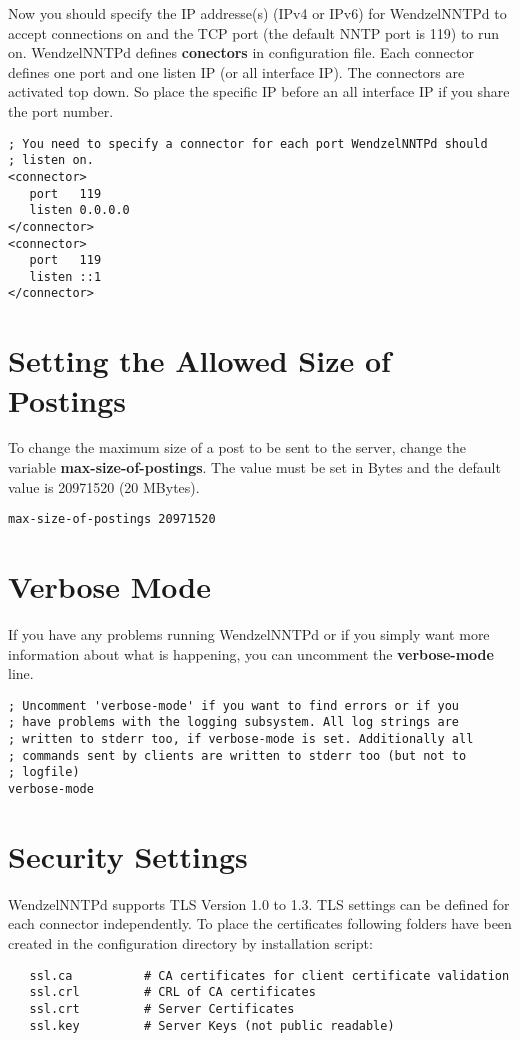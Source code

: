 Now you should specify the IP addresse(s) (IPv4 or IPv6) for WendzelNNTPd to accept connections on and the TCP port (the default NNTP port is 119) to run on.
WendzelNNTPd defines \textbf{conectors} in configuration file.
Each connector defines one port and one listen IP (or all interface IP).
The connectors are activated top down.
So place the specific IP before an all interface IP if you share the port number.

\begin{verbatim}
; You need to specify a connector for each port WendzelNNTPd should
; listen on.
<connector>
   port   119
   listen 0.0.0.0
</connector>
<connector>
   port   119
   listen ::1
</connector>
\end{verbatim}

\section{Setting the Allowed Size of Postings}

To change the maximum size of a post to be sent to the server, change the variable \textbf{max-size-of-postings}. The value must be set in Bytes and the default value is 20971520 (20 MBytes).

\begin{verbatim}
max-size-of-postings 20971520
\end{verbatim}

\section{Verbose Mode}

If you have any problems running WendzelNNTPd or if you simply want more information about what is happening, you can uncomment the \textbf{verbose-mode} line.

\begin{verbatim}
; Uncomment 'verbose-mode' if you want to find errors or if you
; have problems with the logging subsystem. All log strings are
; written to stderr too, if verbose-mode is set. Additionally all
; commands sent by clients are written to stderr too (but not to
; logfile)
verbose-mode
\end{verbatim}

\section{Security Settings}

WendzelNNTPd supports TLS Version 1.0 to 1.3.
TLS settings can be defined for each connector independently.
To place the certificates following folders have been created in the configuration directory by installation script:
\begin{verbatim}
   ssl.ca          # CA certificates for client certificate validation
   ssl.crl         # CRL of CA certificates
   ssl.crt         # Server Certificates
   ssl.key         # Server Keys (not public readable)   
\end{verbatim}


